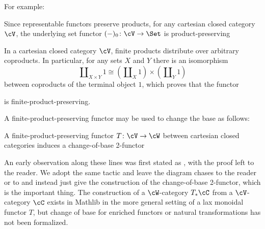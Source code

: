 For example:


\begin{ex}\label{ex:lax-u-set} Since representable functors preserve products, for any cartesian closed category $\cV$, the underlying set functor $(-)_0 \colon \cV \to \Set$ is product-preserving
\end{ex}

\begin{ex}\label{ex:strong-free} In a cartesian closed category $\cV$, finite products distribute over arbitrary coproducts. In particular, for any sets $X$ and $Y$ there is an isomorphism
\[ \amalg_{X \times Y} 1 \cong (\amalg_X 1) \times (\amalg_Y 1)\] between coproducts of the terminal object $1$, which proves that the functor
\begin{center}
\end{center} is finite-product-preserving.
\end{ex}

A finite-product-preserving functor may be used to change the base as follows:

\begin{proposition}\label{prop:change-of-base}
  \leanok
  A finite-product-preserving functor $T \colon \cV \to \cW$ between cartesian closed categories induces a change-of-base 2-functor \begin{center} \end{center}
\end{proposition}

An early observation along these lines was first stated as \cite[II.6.3]{EilenbergKelly:1966cc}, with the proof left to the reader. We adopt the same tactic and leave the diagram chases to the reader or to \cite[4.2.4]{Cruttwell:2008rr} and instead just give the construction of the change-of-base 2-functor, which is the important thing. The construction of a $\cW$-category $T_*\cC$ from a $\cV$-category $\cC$ exists in Mathlib in the more general setting of a lax monoidal functor $T$, but change of base for enriched functors or natural transformations has not been formalized.

